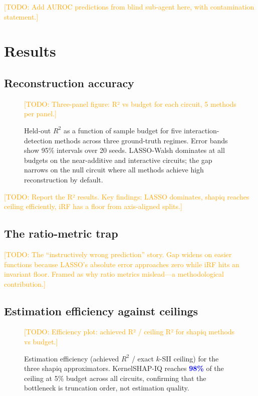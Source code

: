 \documentclass[11pt]{article}
\newcommand{\todo}[1]{\textcolor{orange}{[TODO: #1]}}
\newcommand{\numplaceholder}[1]{\textcolor{blue}{\textbf{#1}}}
\begin{document}
\todo{Add AUROC predictions from blind sub-agent here, with
contamination statement.}


\section{Results}
\label{sec:results}

\subsection{Reconstruction accuracy}

\begin{figure}[t]
\centering
\todo{Three-panel figure: R² vs budget for each circuit, 5 methods per panel.}
\caption{Held-out $R^2$ as a function of sample budget for five
interaction-detection methods across three ground-truth regimes. Error
bands show 95\% intervals over 20 seeds. LASSO-Walsh dominates at all
budgets on the near-additive and interactive circuits; the gap narrows
on the null circuit where all methods achieve high reconstruction by
default.}
\label{fig:r2-budget}
\end{figure}

\todo{Report the R² results. Key findings: LASSO dominates, shapiq
reaches ceiling efficiently, iRF has a floor from axis-aligned splits.}

\subsection{The ratio-metric trap}

\todo{The ``instructively wrong prediction'' story. Gap widens on easier
functions because LASSO's absolute error approaches zero while iRF hits
an invariant floor. Framed as why ratio metrics mislead---a
methodological contribution.}

\subsection{Estimation efficiency against ceilings}

\begin{figure}[t]
\centering
\todo{Efficiency plot: achieved R² / ceiling R² for shapiq methods vs budget.}
\caption{Estimation efficiency (achieved $R^2$ / exact $k$-SII ceiling)
for the three shapiq approximators. KernelSHAP-IQ reaches
\numplaceholder{98\%} of the ceiling at 5\% budget across all circuits,
confirming that the bottleneck is truncation order, not estimation
quality.}
\label{fig:efficiency}
\end{figure}
\end{document}

